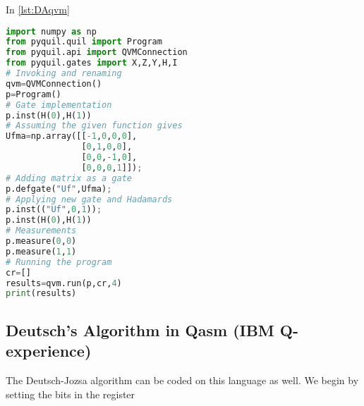 In \autoref{lst:DAqvm}

\begin{lstlisting}[language=Python,caption={Deutsch's algorithm with pyQuil},label={lst:DAqvm},frame=single]
import numpy as np
from pyquil.quil import Program
from pyquil.api import QVMConnection 
from pyquil.gates import X,Z,Y,H,I 
# Invoking and renaming
qvm=QVMConnection()
p=Program() 
# Gate implementation
p.inst(H(0),H(1)) 
# Assuming the given function gives
Ufma=np.array([[-1,0,0,0],
               [0,1,0,0],
               [0,0,-1,0],
               [0,0,0,1]]);
# Adding matrix as a gate               
p.defgate("Uf",Ufma); 
# Applying new gate and Hadamards
p.inst(("Uf",0,1)); 
p.inst(H(0),H(1))
# Measurements
p.measure(0,0)
p.measure(1,1) 
# Running the program
cr=[] 
results=qvm.run(p,cr,4) 
print(results)
\end{lstlisting}

\subsection{Deutsch's Algorithm in Qasm (IBM Q-experience)}
The Deutsch-Jozsa algorithm can be coded on this language as well. We begin by setting the bits in the register 
\begin{lstlisting}[language=Python,float=h]


\end{lstlisting}